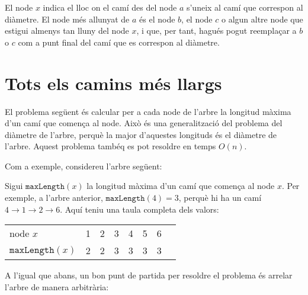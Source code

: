 El node $x$ indica el lloc on el camí des del node $a$ s'uneix al camí
que correspon al diàmetre. El node més allunyat de $a$ és el node $b$,
el node $c$ o algun altre node que estigui almenys tan lluny del node
$x$, i que, per tant, hagués pogut reemplaçar a $b$ o $c$ com a punt
final del camí que es correspon al diàmetre.

\section{Tots els camins més llargs}

El problema següent és calcular per a cada node de l'arbre la longitud
màxima d'un camí que comença al node. Això és una generalització del
problema del diàmetre de l'arbre, perquè la major d'aquestes longituds
és el diàmetre de l'arbre. Aquest problema tambéq es pot resoldre en
temps $O(n)$.

Com a exemple, considereu l'arbre següent:
\begin{center}
\end{center}


Sigui $\texttt{maxLength}(x)$ la longitud màxima d'un camí que comença
al node $x$. Per exemple, a l'arbre anterior,
$\texttt{maxLength}(4)=3$, perquè hi ha un camí $4 \rightarrow 1
\rightarrow 2 \rightarrow 6$. Aquí teniu una taula completa dels
valors:
\begin{center}
\begin{tabular}{l|lllllll}
node $x$ & 1 & 2 & 3 & 4 & 5 & 6 \\
$\texttt{maxLength}(x)$ & 2 & 2 & 3 & 3 & 3 & 3 \\
\end{tabular}
\end{center}


A l'igual que abans, un bon punt de partida per resoldre el problema
és arrelar l'arbre de manera arbitrària:
\begin{center}
\end{center}


